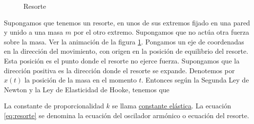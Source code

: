 \begin{figure}[h]
 \begin{center}
 \caption{Resorte}\label{fig:resortito}
 \end{center}
 \end{figure}

 Supongamos que tenemos un resorte, en unos de sus extremos fijado en una pared y unido a una masa $m$ por el otro extremo. Supongamos que no actúa otra fuerza
 sobre la masa. Ver la animación de la figura \ref{fig:resortito}.  Pongamos un eje de coordenadas en la dirección del movimiento, con origen en la posición de equilibrio
 del resorte. Esta posición es el punto donde el resorte no ejerce fuerza. Supongamos que la dirección positiva es la dirección donde el resorte se expande. Denotemos
 por $x(t)$ la posición de la masa en el momento $t$.    Entonces según la Segunda Ley de Newton y la Ley de Elasticidad de Hooke, tenemos que


La constante de proporcionalidad $k$ se llama \href{http://es.wikipedia.org/wiki/Rigidez}{constante elástica}. La ecuación \eqref{eq:resorte} se denomina la
ecuación del oscilador armónico o ecuación del resorte.

